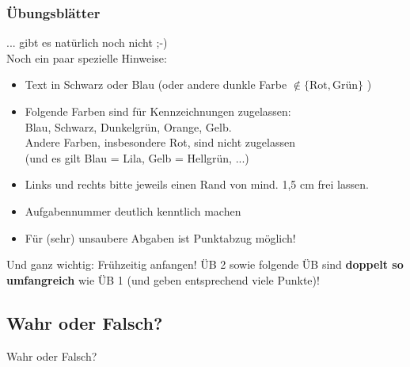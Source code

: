 





\graphicspath{{../figures/}}



\begin{frame}
	\frametitle{Übungsblätter}
	\pause
	... gibt es natürlich noch nicht ;-) \\[1em]
	\pause
	Noch ein paar spezielle Hinweise:
	\begin{itemize}
		\item Text in Schwarz oder Blau (oder andere dunkle Farbe $\notin \{\text{Rot}, \text{Grün}\}$ )
		\item Folgende Farben sind für Kennzeichnungen zugelassen:\\
		Blau, Schwarz, Dunkelgrün, Orange, Gelb.\\
		Andere Farben, insbesondere Rot, sind nicht zugelassen \\
		(und es gilt Blau = Lila, Gelb = Hellgrün, ...)
		\item Links und rechts bitte jeweils einen Rand von mind. 1,5 cm frei lassen.
		\item Aufgabennummer deutlich kenntlich machen
		\item Für (sehr) unsaubere Abgaben ist Punktabzug möglich!
	\end{itemize}
	
	Und ganz wichtig: Frühzeitig anfangen! ÜB 2 sowie folgende ÜB sind \textbf{doppelt so umfangreich} wie ÜB 1 (und geben entsprechend viele Punkte)!
\end{frame}

\framePrevEpisode

\subsection{Wahr oder Falsch?}
\begin{frame}
	\begin{block}{Wahr oder Falsch?}
		\begin{itemize}
		\end{itemize}
	\end{block}
\end{frame}

